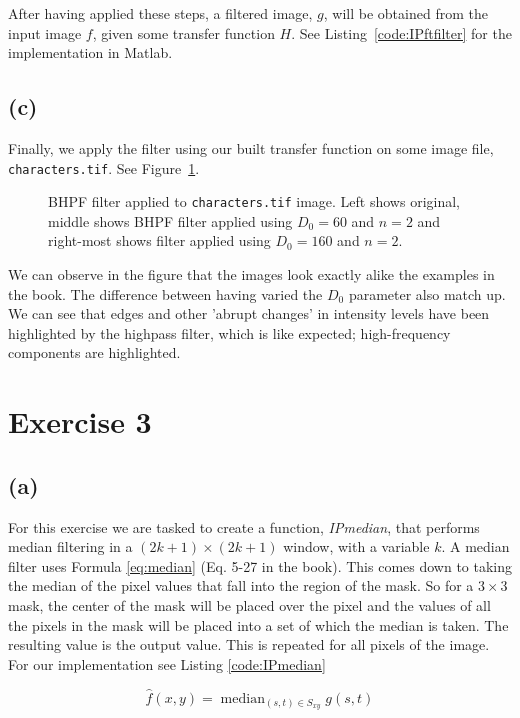 \documentclass{article}
\begin{document}
After having applied these steps, a filtered image, $g$, will be obtained from the input image $f$, given some transfer function $H$. See  Listing~\ref{code:IPftfilter} for the implementation in Matlab.

\subsection*{(c)} Finally, we apply the filter using our built transfer function on some image file, \texttt{characters.tif}. See Figure~\ref{fig:characters_all_bhpf}.

\begin{figure}[ht]
    \centering
    
    \caption{BHPF filter applied to \texttt{characters.tif} image. Left shows original, middle shows BHPF filter applied using $D_0 = 60$ and $n = 2$ and right-most shows filter applied using $D_0 = 160$ and $n = 2$.}
    \label{fig:characters_all_bhpf}
\end{figure}

We can observe in the figure that the images look exactly alike the examples in the book. The difference between having varied the $D_0$ parameter also match up. We can see that edges and other 'abrupt changes' in intensity levels have been highlighted by the highpass filter, which is like expected; high-frequency components are highlighted.

\section*{Exercise 3}
\subsection*{(a)}
For this exercise we are tasked to create a function, \textit{IPmedian}, that performs median filtering in a $(2k + 1) \times (2k + 1)$ window, with a variable $k$. A median filter uses Formula \ref{eq:median} (Eq. 5-27 in the book). This comes down to taking the median of the pixel values that fall into the region of the mask. So for a $3 \times 3$ mask, the center of the mask will be placed over the pixel and the values of all the pixels in the mask will be placed into a set of which the median is taken. The resulting value is the output value. This is repeated for all pixels of the image. For our implementation see  Listing \ref{code:IPmedian}

\begin{equation}\label{eq:median}
    \widehat{f}(x, y)=\operatorname{median}_{(s, t) \in S_{x y}} g(s, t)
\end{equation}
\end{document}
